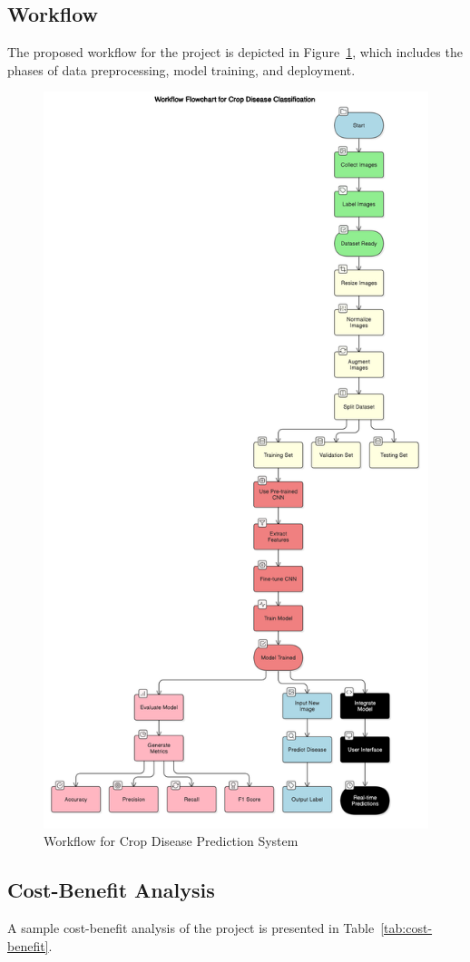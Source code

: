 \subsection{Workflow}
The proposed workflow for the project is depicted in Figure~\ref{fig:methodology_workflow}, which includes the phases of data preprocessing, model training, and deployment.

\begin{figure}[h]
    \centering
    \includegraphics[width=0.5\linewidth]{Images/flow.png}
    \caption{Workflow for Crop Disease Prediction System}
    \label{fig:methodology_workflow}
\end{figure}

\subsection{Cost-Benefit Analysis}
A sample cost-benefit analysis of the project is presented in Table~\ref{tab:cost-benefit}.

